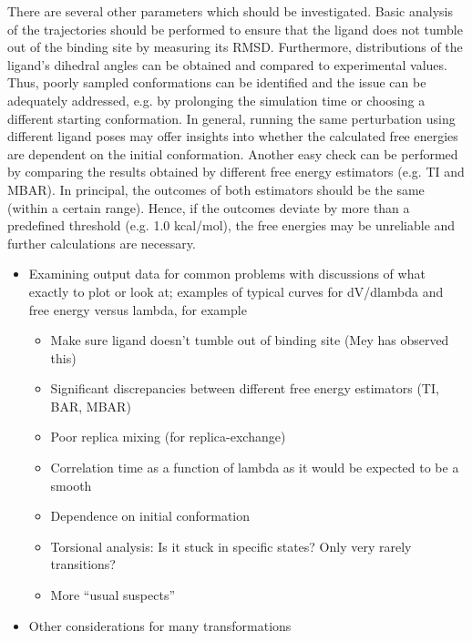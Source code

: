 \documentclass[9pt,bestpractices]{livecoms}
\begin{document}
There are several other parameters which should be investigated. Basic analysis of the trajectories should be performed to ensure that the ligand does not tumble out of the binding site by measuring its RMSD. Furthermore, distributions of the ligand's dihedral angles can be obtained and compared to experimental values. Thus, poorly sampled conformations can be identified and the issue can be adequately addressed, e.g. by prolonging the simulation time or choosing a different starting conformation. In general, running the same perturbation using different ligand poses may offer insights into whether the calculated free energies are dependent on the initial conformation.
Another easy check can be performed by comparing the results obtained by different free energy estimators (e.g. TI and MBAR). In principal, the outcomes of both estimators should be the same (within a certain range). Hence, if the outcomes deviate by more than a predefined threshold (e.g. 1.0 kcal/mol), the free energies may be unreliable and further calculations are necessary.
\begin{itemize}
\item Examining output data for common problems with discussions of what exactly to plot or look at; examples of typical curves for dV/dlambda and free energy versus lambda, for example
\begin{itemize}
\item Make sure ligand doesn’t tumble out of binding site (Mey has observed this)
\item Significant discrepancies between different free energy estimators (TI, BAR, MBAR)
\item Poor replica mixing (for replica-exchange)
\item Correlation time as a function of lambda as it would be expected to be a smooth
\item Dependence on initial conformation
\item Torsional analysis: Is it stuck in specific states? Only very rarely transitions?
\item More “usual suspects”
\end{itemize}
\item Other considerations for many transformations
\end{itemize}
\end{document}

